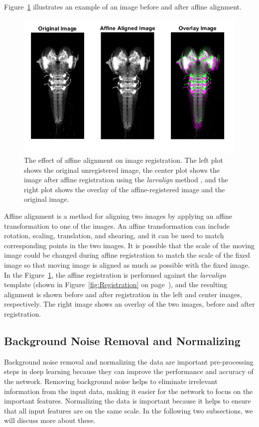 \documentclass{book}
\begin{document}
	Figure~\ref{fig:affine_larvalign} illustrates an example of an image before and after affine alignment.
	
	\begin{figure}[h!]
		\centering
		\includegraphics[width=0.7\columnwidth]{resources/chapter3/np_58E02_37E10_MB299C_021713A_scaled.tif.png}
		\caption{The effect of affine alignment on image registration. The left plot shows the original unregistered image, the center plot shows the image after affine registration using the \textit{larvalign} method \cite{larvalign}, and the right plot shows the overlay of the affine-registered image and the original image.}
		\label{fig:affine_larvalign}
	\end{figure}

	Affine alignment is a method for aligning two images by applying an affine transformation to one of the images. An affine transformation can include rotation, scaling, translation, and shearing, and it can be used to match corresponding points in the two images. It is possible that the scale of the moving image could be changed during affine registration to match the scale of the fixed image so that moving image is aligned as much as possible with the fixed image. In the Figure~\ref{fig:affine_larvalign}, the affine registration is performed against the \textit{larvalign} template (shown in Figure~\ref{fig:Registration} on page~\pageref{fig:Registration}), and the resulting alignment is shown before and after registration in the left and center images, respectively. The right image shows an overlay of the two images, before and after registration.
	
	\subsection{Background Noise Removal and Normalizing}
	Background noise removal and normalizing the data are important pre-processing steps in deep learning because they can improve the performance and accuracy of the network. Removing background noise helps to eliminate irrelevant information from the input data, making it easier for the network to focus on the important features. Normalizing the data is important because it helps to ensure that all input features are on the same scale. In the following two subsections, we will discuss more about these.
\end{document}
